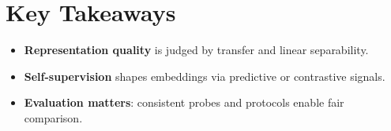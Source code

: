 
\section*{Key Takeaways}

\begin{itemize}[leftmargin=2em]
    \item \textbf{Representation quality} is judged by transfer and linear separability.
    \item \textbf{Self-supervision} shapes embeddings via predictive or contrastive signals.
    \item \textbf{Evaluation matters}: consistent probes and protocols enable fair comparison.
\end{itemize}


